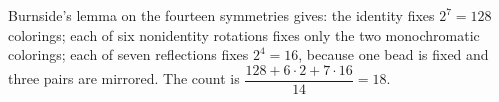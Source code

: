 Burnside's lemma on the fourteen symmetries gives: the identity fixes $2^7=128$ colorings; each of six nonidentity rotations fixes only the two monochromatic colorings; each of seven reflections fixes $2^4=16$, because one bead is fixed and three pairs are mirrored. The count is $\dfrac{128+6\cdot2+7\cdot16}{14}=\boxed{18}$.

